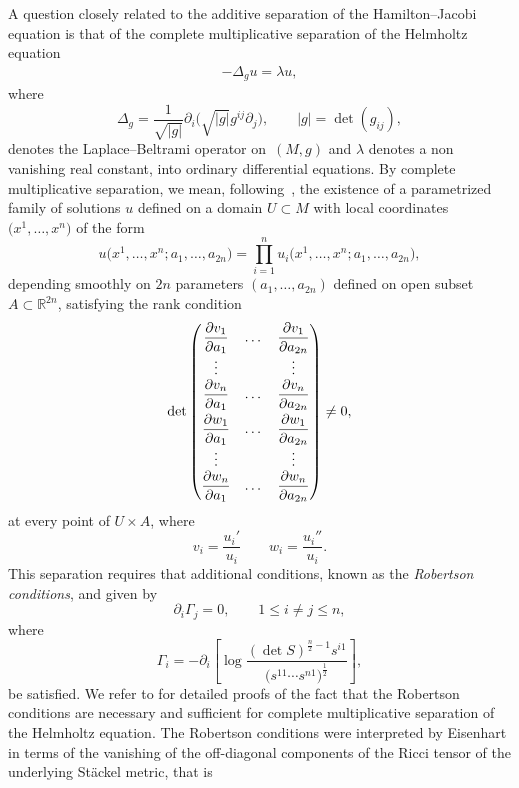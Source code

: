 \documentclass[pdftex]{sigma}
\numberwithin{equation}{section}
\begin{document}
 A question closely related to the additive separation of the Hamilton--Jacobi equation is that of the complete multiplicative separation of the Helmholtz equation
 \begin{gather}\label{Helm}
-\Delta_{g} u =\lambda u,
\end{gather}
where
\[
\Delta_{g} = \frac{1}{\sqrt{|g|}}\partial_{i}\Big(\sqrt{|g|}g^{ij}\partial_{j}\Big),\qquad |g|=\det(g_{ij}),
\]
denotes the Laplace--Beltrami operator on~$(M,g)$ and $\lambda$ denotes a non vanishing real constant, into ordinary differential equations. By complete multiplicative separation, we mean, follo\-wing~\cite{BCR1-2002}, the existence of a parametrized family of solutions $u$ defined on a domain $U\subset M$ with local coordinates $\big(x^{1},\dots, x^{n}\big)$ of the form
\[
u\big(x^{1},\dots, x^{n};a_{1},\dots, a_{2n}\big)=\prod_{i=1}^{n}u_{i}\big(x^{1},\dots, x^{n};a_{1},\dots, a_{2n}\big),
\]
depending smoothly on $2n$ parameters $(a_{1},\dots, a_{2n})$ defined on open subset $A\subset {\mathbb R}^{2n}$, satisfying the rank condition
\begin{gather*}%
\det \left(
\begin{matrix}
\dfrac{\partial v_{1}}{\partial a_{1}}&\dots&\dfrac{\partial v_{1}}{\partial a_{2n}} \\
\vdots& & \vdots \\
\dfrac{\partial v_{n}}{\partial a_{1}}&\dots&\dfrac {\partial v_{n}}{\partial a_{2n}}\vspace{1mm}\\
\dfrac{\partial w_{1}}{\partial a_{1}}&\dots&\dfrac{\partial w_{1}}{\partial a_{2n}} \\
\vdots& & \vdots \\
\dfrac{\partial w_{n}}{\partial a_{1}}&\dots&\dfrac {\partial w_{n}}{\partial a_{2n}}
\end{matrix}
\right) \neq 0,
\end{gather*}
at every point of $U\times A$, where
\[
v_{i}=\frac{u_{i}'}{u_{i}} \qquad w_{i}=\frac{u_{i}''}{u_{i}}.
\]
This separation requires that additional conditions, known as the {\emph{Robertson conditions}}, and given by
\[
\partial_{i}\Gamma_{j}=0,\qquad 1\leq i\neq j\leq n,
\]
where
\[
\Gamma_{i}=-\partial_{i}\left[\log \frac{(\det S)^{\frac{n}{2}-1}s^{i1}}{\big(s^{11}\cdots s^{n1}\big)^{\frac{1}{2}}}\right],
\]
be satisfied. We refer to \cite{BCR1-2002,BCR2-2002,Eis1934,KaMi1980,KaMi1981,Rob1928} for detailed proofs of the fact that the Robertson conditions are necessary and sufficient for complete multiplicative separation of the Helmholtz equation. The Robertson conditions were interpreted by Eisenhart \cite{Eis1934} in terms of the vanishing of the off-diagonal components of the Ricci tensor of the underlying St\"ackel metric, that is
\end{document}
